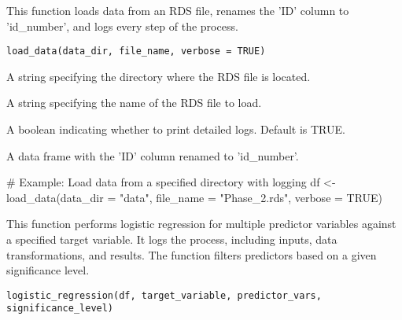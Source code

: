 \documentclass[a4paper]{book}
\begin{document}
%
\begin{Description}
This function loads data from an RDS file, renames the 'ID' column to 'id\_number', and logs every step of the process.
\end{Description}
%
\begin{Usage}
\begin{verbatim}
load_data(data_dir, file_name, verbose = TRUE)
\end{verbatim}
\end{Usage}
%
\begin{Arguments}
\begin{ldescription}
\item[\code{data\_dir}] A string specifying the directory where the RDS file is located.

\item[\code{file\_name}] A string specifying the name of the RDS file to load.

\item[\code{verbose}] A boolean indicating whether to print detailed logs. Default is TRUE.
\end{ldescription}
\end{Arguments}
%
\begin{Value}
A data frame with the 'ID' column renamed to 'id\_number'.
\end{Value}
%
\begin{Examples}
\begin{ExampleCode}
# Example: Load data from a specified directory with logging
df <- load_data(data_dir = "data", file_name = "Phase_2.rds", verbose = TRUE)

\end{ExampleCode}
\end{Examples}
%
\begin{Description}
This function performs logistic regression for multiple predictor variables
against a specified target variable. It logs the process, including inputs,
data transformations, and results. The function filters predictors based on
a given significance level.
\end{Description}
%
\begin{Usage}
\begin{verbatim}
logistic_regression(df, target_variable, predictor_vars, significance_level)
\end{verbatim}
\end{Usage}
\end{document}
